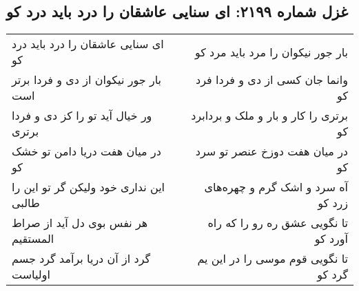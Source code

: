 \begin{center}
\section*{غزل شماره ۲۱۹۹: ای سنایی عاشقان را درد باید درد کو}
\label{sec:2199}
\begin{longtable}{l p{0.5cm} r}
ای سنایی عاشقان را درد باید درد کو
&&
بار جور نیکوان را مرد باید مرد کو
\\
بار جور نیکوان از دی و فردا برتر است
&&
وانما جان کسی از دی و فردا فرد کو
\\
ور خیال آید تو را کز دی و فردا برتری
&&
برتری را کار و بار و ملک و بردابرد کو
\\
در میان هفت دریا دامن تو خشک کو
&&
در میان هفت دوزخ عنصر تو سرد کو
\\
این نداری خود ولیکن گر تو این را طالبی
&&
آه سرد و اشک گرم و چهره‌های زرد کو
\\
هر نفس بوی دل آید از صراط المستقیم
&&
تا نگویی عشق ره رو را که راه آورد کو
\\
گرد از آن دریا برآمد گرد جسم اولیاست
&&
تا نگویی قوم موسی را در این یم گرد کو
\\
\end{longtable}
\end{center}
